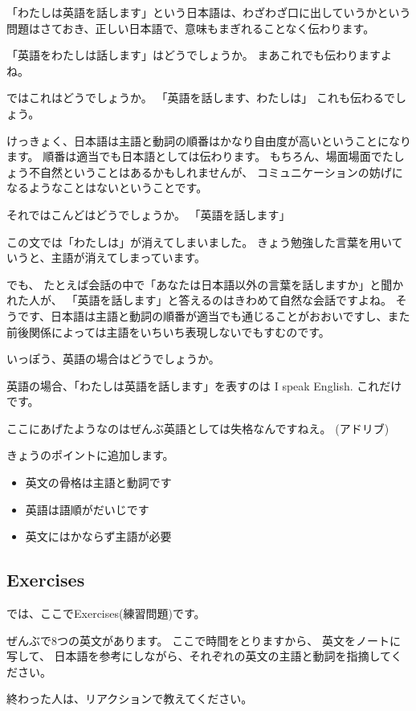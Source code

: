 \documentclass[12pt]{jlreq}
\begin{document}
「わたしは英語を話します」という日本語は、わざわざ口に出していうかという問題はさておき、正しい日本語で、意味もまぎれることなく伝わります。

「英語をわたしは話します」はどうでしょうか。
まあこれでも伝わりますよね。

ではこれはどうでしょうか。
「英語を話します、わたしは」
これも伝わるでしょう。

けっきょく、日本語は主語と動詞の順番はかなり自由度が高いということになります。
順番は適当でも日本語としては伝わります。
もちろん、場面場面でたしょう不自然ということはあるかもしれませんが、
コミュニケーションの妨げになるようなことはないということです。


それではこんどはどうでしょうか。
「英語を話します」

この文では「わたしは」が消えてしまいました。
きょう勉強した言葉を用いていうと、主語が消えてしまっています。

でも、
たとえば会話の中で「あなたは日本語以外の言葉を話しますか」と聞かれた人が、
「英語を話します」と答えるのはきわめて自然な会話ですよね。
そうです、日本語は主語と動詞の順番が適当でも通じることがおおいですし、また前後関係によっては主語をいちいち表現しないでもすむのです。

いっぽう、英語の場合はどうでしょうか。

英語の場合、「わたしは英語を話します」を表すのは
I speak English.
これだけです。

ここにあげたようなのはぜんぶ英語としては失格なんですねえ。
(アドリブ)

きょうのポイントに追加します。
\begin{itemize}
 \item   英文の骨格は主語と動詞です
 \item   英語は語順がだいじです
 \item   英文にはかならず主語が必要
\end{itemize}

\subsection{Exercises}

では、ここでExercises(練習問題)です。

ぜんぶで8つの英文があります。
ここで時間をとりますから、
英文をノートに写して、
日本語を参考にしながら、それぞれの英文の主語と動詞を指摘してください。

終わった人は、リアクションで教えてください。
\end{document}
